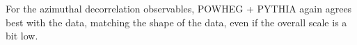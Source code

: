 For the azimuthal decorrelation observables, POWHEG + PYTHIA again agrees best with the data, matching the shape of the data, even if the overall scale is a bit low.

%
%
%
%
%
%

